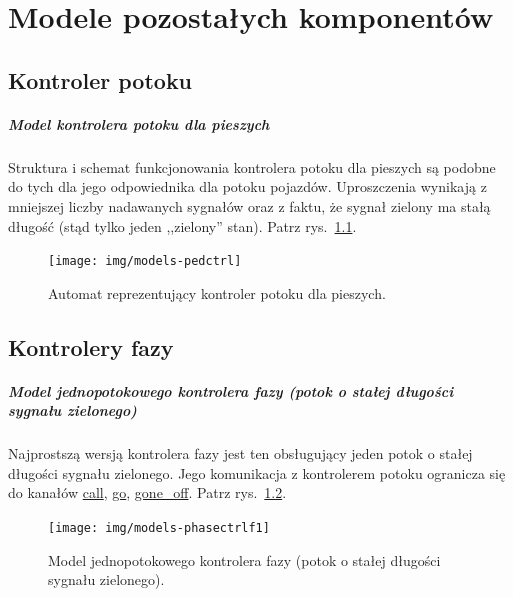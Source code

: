 \documentclass{pracamgr}
\newcommand{\imgr}[1]{rys.~\ref{#1}}
\newcommand{\ttt}[1]{\url{#1}}
\theoremstyle{plain}
\begin{document}
\appendix
\chapter{Modele pozostałych komponentów}
\label{app:other-models}

\section{Kontroler potoku}
\paragraph{Model kontrolera potoku dla pieszych} Struktura i schemat
funkcjonowania kontrolera potoku dla pieszych są podobne do tych dla
jego odpowiednika dla potoku pojazdów. Uproszczenia wynikają z
mniejszej liczby nadawanych sygnałów oraz z faktu, że sygnał zielony
ma stałą długość (stąd tylko jeden ,,zielony'' stan). Patrz
\imgr{img:models-extra:pedctrl}.
\begin{figure}[ht]
  \texttt{[image: img/models-pedctrl]}
  \caption{Automat reprezentujący kontroler potoku dla pieszych.}
  \label{img:models-extra:pedctrl}
\end{figure}
\clearpage{}

\section{Kontrolery fazy}
\paragraph{Model jednopotokowego kontrolera fazy (potok o stałej
  długości sygnału zielonego)} Najprostszą wersją kontrolera fazy jest
ten obsługujący jeden potok o stałej długości sygnału zielonego. Jego
komunikacja z kontrolerem potoku ogranicza się do kanałów \ttt{call},
\ttt{go}, \ttt{gone_off}. Patrz \imgr{img:models-extra:phasectrlf1}.
\begin{figure}[h]
  \texttt{[image: img/models-phasectrlf1]}
  \caption{Model jednopotokowego kontrolera fazy (potok o stałej
  długości sygnału zielonego).}
  \label{img:models-extra:phasectrlf1}
\end{figure}
\end{document}
